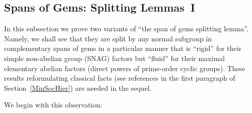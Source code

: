 \documentclass[a4paper,11pt]{amsart}
\theoremstyle{definition}
\newcommand{\1}{{\mathbf 1}}
\begin{document}
\subsection{Spans of Gems:  Splitting Lemmas~I}\label{1stSplittingLemmas}



In this subsection we prove two variants of ``the span of gems splitting lemma''.  Namely, we shall see that they are split by any normal subgroup in complementary spans of gems in a particular manner that is ``rigid'' for their simple non-abelian group (SNAG) factors but ``fluid'' for their maximal elementary abelian factors (direct powers of prime-order cyclic groups).  These results reformulating classical facts (see references in the first paragraph of Section~\ref{MinSocHier})  are needed in the sequel.


We begin with this observation: 
\end{document}
